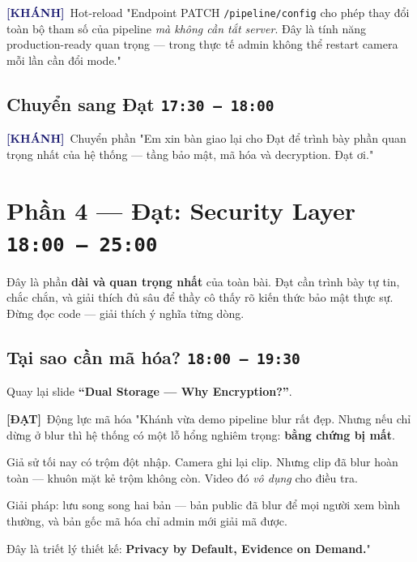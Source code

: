 \documentclass[12pt, a4paper]{article}
\newcommand{\timing}[1]{%
  \hfill\colorbox{NavyBlue!20}{\texttt{\small #1}}%
}
\newcommand{\dat}{\textcolor{BrickRed}{\textbf{[ĐẠT]}}}
\newcommand{\khanh}{\textcolor{MidnightBlue}{\textbf{[KHÁNH]}}}
\begin{document}
\begin{dialog}{\khanh\ Hot-reload}
"Endpoint PATCH \texttt{/pipeline/config} cho phép thay đổi
toàn bộ tham số của pipeline \textit{mà không cần tắt server}.
Đây là tính năng production-ready quan trọng ---
trong thực tế admin không thể restart camera mỗi lần cần đổi mode."
\end{dialog}

\subsection{Chuyển sang Đạt \timing{17:30 – 18:00}}

\begin{dialog}{\khanh\ Chuyển phần}
"Em xin bàn giao lại cho Đạt để trình bày phần quan trọng nhất của hệ thống ---
tầng bảo mật, mã hóa và decryption. Đạt ơi."
\end{dialog}

\section{Phần 4 — Đạt: Security Layer \timing{18:00 – 25:00}}

\begin{note}
Đây là phần \textbf{dài và quan trọng nhất} của toàn bài.
Đạt cần trình bày tự tin, chắc chắn, và giải thích đủ sâu
để thầy cô thấy rõ kiến thức bảo mật thực sự.
Đừng đọc code --- giải thích ý nghĩa từng dòng.
\end{note}

\subsection{Tại sao cần mã hóa? \timing{18:00 – 19:30}}

\begin{action}
Quay lại slide \textbf{``Dual Storage — Why Encryption?''}.
\end{action}

\begin{dialog}{\dat\ Động lực mã hóa}
"Khánh vừa demo pipeline blur rất đẹp.
Nhưng nếu chỉ dừng ở blur thì hệ thống có một lỗ hổng nghiêm trọng:
\textbf{bằng chứng bị mất}.

Giả sử tối nay có trộm đột nhập. Camera ghi lại clip.
Nhưng clip đã blur hoàn toàn --- khuôn mặt kẻ trộm không còn.
Video đó \textit{vô dụng} cho điều tra.

Giải pháp: lưu song song hai bản ---
bản public đã blur để mọi người xem bình thường,
và bản gốc mã hóa chỉ admin mới giải mã được.

Đây là triết lý thiết kế: \textbf{Privacy by Default, Evidence on Demand.}"
\end{dialog}
\end{document}
